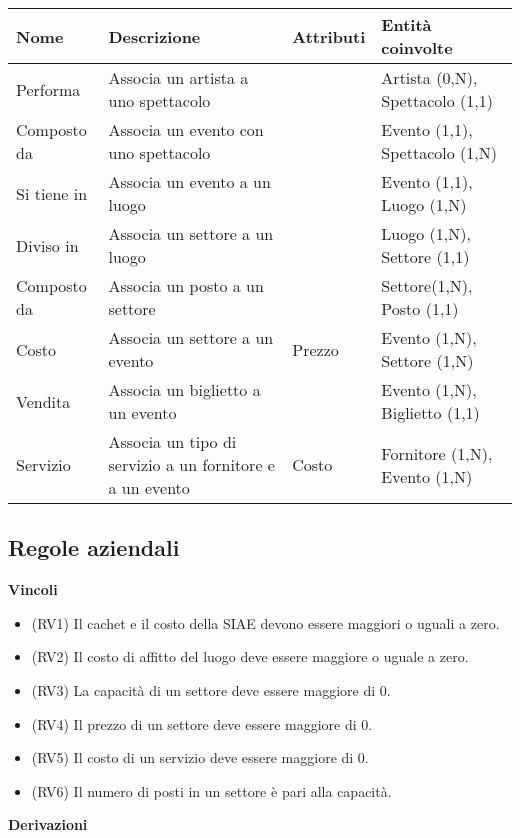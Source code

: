 \documentclass[a4paper,11pt]{article}
\begin{document}
\begin{tabularx}{\textwidth}{|X|>{\raggedright\arraybackslash}X|>{\raggedright\arraybackslash}X|>{\raggedright\arraybackslash}X|}
\hline
\textbf{Nome} & \textbf{Descrizione} & \textbf{Attributi} & \textbf{Entità coinvolte}\\
\hline
Performa & Associa un artista a uno spettacolo & & Artista (0,N), Spettacolo (1,1)\\
\hline
Composto da & Associa un evento con uno spettacolo & & Evento (1,1), Spettacolo (1,N)\\
\hline
Si tiene in & Associa un evento a un luogo & & Evento (1,1), Luogo (1,N)\\
\hline
Diviso in & Associa un settore a un luogo & & Luogo (1,N), Settore (1,1)\\
\hline
Composto da & Associa un posto a un settore & & Settore(1,N), Posto (1,1)\\
\hline
Costo & Associa un settore a un evento & Prezzo & Evento (1,N), Settore (1,N)\\
\hline
Vendita & Associa un biglietto a un evento & & Evento (1,N), Biglietto (1,1)\\
\hline
Servizio & Associa un tipo di servizio a un fornitore e a un evento & Costo & Fornitore (1,N), Evento (1,N)\\
\hline
\end{tabularx}

\subsection{Regole aziendali}

\textbf{Vincoli}

\begin{itemize}
  \item (RV1) Il cachet e il costo della SIAE devono essere maggiori o uguali a zero.
  \item (RV2) Il costo di affitto del luogo deve essere maggiore o uguale a zero.
  \item (RV3) La capacità di un settore deve essere maggiore di 0.
  \item (RV4) Il prezzo di un settore deve essere maggiore di 0.
  \item (RV5) Il costo di un servizio deve essere maggiore di 0.
  \item (RV6) Il numero di posti in un settore è pari alla capacità.
\end{itemize}

\textbf{Derivazioni}
\end{document}
